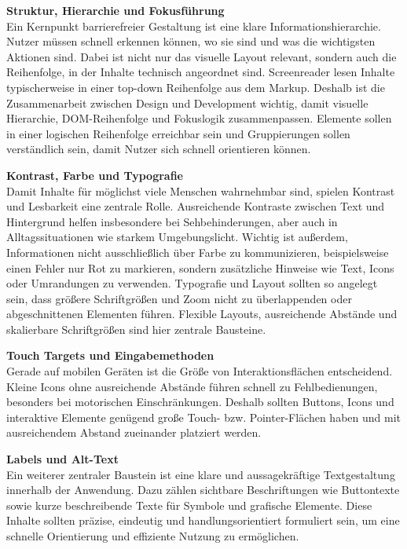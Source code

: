 \vspace{0.5em}
\textbf{Struktur, Hierarchie und Fokusführung}\\
Ein Kernpunkt barrierefreier Gestaltung ist eine klare Informationshierarchie. Nutzer müssen schnell erkennen können, wo sie sind und was die wichtigsten 
Aktionen sind. Dabei ist nicht nur das visuelle Layout relevant, sondern auch die Reihenfolge, in der Inhalte technisch angeordnet sind. Screenreader lesen 
Inhalte typischerweise in einer top-down Reihenfolge aus dem Markup. Deshalb ist die Zusammenarbeit zwischen Design und Development wichtig, damit visuelle 
Hierarchie, DOM-Reihenfolge und Fokuslogik zusammenpassen. Elemente sollen
in einer logischen Reihenfolge erreichbar sein und Gruppierungen sollen verständlich sein, damit Nutzer sich schnell orientieren können. \cite{uxmatters} \cite{materialdesign}

\vspace{0.5em}

\textbf{Kontrast, Farbe und Typografie}\\
Damit Inhalte für möglichst viele Menschen wahrnehmbar sind, spielen Kontrast und Lesbarkeit eine zentrale Rolle. Ausreichende Kontraste zwischen Text 
und Hintergrund helfen insbesondere bei Sehbehinderungen, aber auch in Alltagssituationen wie starkem Umgebungslicht. Wichtig ist außerdem, Informationen 
nicht ausschließlich über Farbe zu kommunizieren, beispielsweise einen Fehler nur Rot zu markieren, sondern zusätzliche Hinweise wie Text, Icons oder Umrandungen zu 
verwenden. Typografie und Layout sollten so angelegt sein, dass größere Schriftgrößen und Zoom nicht zu überlappenden oder abgeschnittenen Elementen führen. 
Flexible Layouts, ausreichende Abstände und skalierbare Schriftgrößen sind hier zentrale Bausteine.\cite{uxmatters} \cite{materialdesign}

\vspace{0.5em}
\textbf{Touch Targets und Eingabemethoden}\\
Gerade auf mobilen Geräten ist die Größe von Interaktionsflächen entscheidend. Kleine Icons ohne ausreichende Abstände führen schnell zu Fehlbedienungen, 
besonders bei motorischen Einschränkungen. Deshalb sollten Buttons, Icons und interaktive Elemente genügend 
große Touch- bzw. Pointer-Flächen haben und mit ausreichendem Abstand zueinander platziert werden.\cite{uxmatters} \cite{materialdesign}

\vspace{0.5em}
\textbf{Labels und Alt-Text}\\
Ein weiterer zentraler Baustein ist eine klare und aussagekräftige Textgestaltung innerhalb der Anwendung. Dazu zählen sichtbare Beschriftungen wie Buttontexte sowie kurze beschreibende Texte für Symbole und grafische Elemente. Diese Inhalte sollten präzise, eindeutig und handlungsorientiert formuliert sein, um eine schnelle Orientierung und effiziente Nutzung zu ermöglichen.

